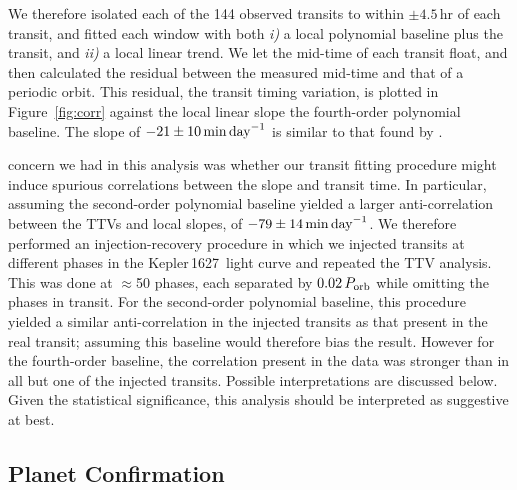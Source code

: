 \documentclass[12pt,modern,twocolumn,tighten,linenumbers]{aastex63}
\newcommand{\sn}{Kepler\,1627} %
\begin{document}
We therefore isolated each of the 144 observed transits to within
$\pm4.5$\,hr of each transit, and fitted each window with both {\it
i)} a local polynomial baseline plus the transit, and {\it ii)} a local linear
trend.  We let the mid-time of each
transit float, and then calculated the residual between the measured
mid-time and that of a periodic orbit.  This residual, the transit
timing variation, is plotted in Figure~\ref{fig:corr} against
the local linear slope  the fourth-order polynomial baseline.  The
slope of $-21 \pm 10\,{\rm min\,day}^{-1}$ is similar to that
found by \citet{holczer_time_2015}. 

 concern we had in this analysis was whether our transit fitting
procedure might induce spurious correlations between the slope and
transit time.  In particular, assuming the second-order polynomial
baseline yielded a larger anti-correlation between the TTVs and local
slopes, of $-79 \pm 14\,{\rm min\,day}^{-1}$.  We therefore
performed an injection-recovery procedure in which we injected
transits at different phases in the \sn\ light curve and repeated the
TTV analysis.  This was done at $\approx$50 phases, each separated by
$0.02\,P_{\rm orb}$ while omitting the phases in transit.  For
the second-order polynomial baseline, this procedure yielded
a similar anti-correlation in the injected transits as that present in the real
transit;
assuming this baseline would therefore bias the
result.  However for the fourth-order baseline, the correlation
present in the data was stronger than in all but one of the injected
transits.
Possible interpretations are discussed below. Given the
statistical significance, this analysis should be interpreted as
suggestive at best.


\subsection{Planet Confirmation}
\end{document}
